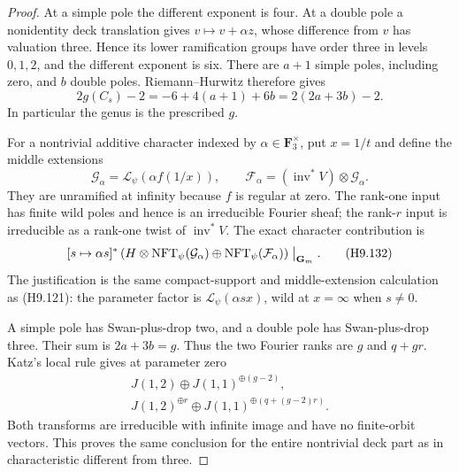\begin{proof}
At a simple pole the different exponent is
four. At a double pole a nonidentity deck
translation gives $v\mapsto v+\alpha z$,
whose difference from $v$ has valuation
three. Hence its lower ramification groups
have order three in levels $0,1,2$, and the
different exponent is six. There are $a+1$
simple poles, including zero, and $b$ double
poles. Riemann--Hurwitz therefore gives
\[
       2g(C_s)-2=-6+4(a+1)+6b=2(2a+3b)-2.
\]
In particular the genus is the prescribed $g$.

For a nontrivial additive character indexed
by $\alpha\in\mathbf F_3^\times$, put
$x=1/t$ and define the middle extensions
\[
 \mathcal G_\alpha=\mathcal L_\psi(\alpha f(1/x)),
 \qquad
 \mathcal F_\alpha=(\operatorname{inv}^*V)
                                      \otimes\mathcal G_\alpha.
\]
They are unramified at infinity because
$f$ is regular at zero. The rank-one input
has finite wild poles and hence is an
irreducible Fourier sheaf; the rank-$r$
input is irreducible as a rank-one twist
of $\operatorname{inv}^*V$. The exact
character contribution is
\[
 [s\mapsto\alpha s]^*
   \left(H\otimes\operatorname{NFT}_\psi(\mathcal G_\alpha)
          \oplus\operatorname{NFT}_\psi(\mathcal F_\alpha)\right)
                                      \bigm|_{\mathbf G_m}.
                                                               \tag{H9.132}
\]
The justification is the same compact-support
and middle-extension calculation as (H9.121):
the parameter factor is
$\mathcal L_\psi(\alpha sx)$, wild at
$x=\infty$ when $s\ne0$.

A simple pole has Swan-plus-drop two, and
a double pole has Swan-plus-drop three.
Their sum is $2a+3b=g$. Thus the two
Fourier ranks are $g$ and $q+gr$.
Katz's local rule gives at parameter zero
\[
 \begin{split}
       J(1,2)\oplus J(1,1)^{\oplus(g-2)},\\
       J(1,2)^{\oplus r}
                  \oplus J(1,1)^{\oplus(q+(g-2)r)}.
 \end{split}                                                  \tag{H9.133}
\]
Both transforms are irreducible with
infinite image and have no finite-orbit
vectors. This proves the same conclusion
for the entire nontrivial deck part as
in characteristic different from three.


\end{proof}
